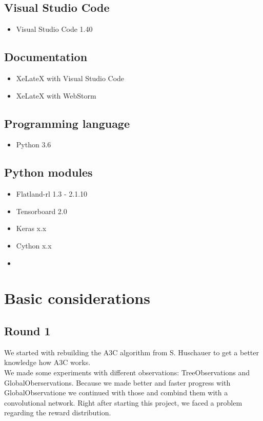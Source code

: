 \subsection*{Visual Studio Code}\label{vsc}
\begin{itemize}
	\item Visual Studio Code 1.40
\end{itemize}

\subsection*{Documentation}\label{dokutools}
\begin{itemize}
	\item XeLateX with Visual Studio Code
	\item XeLateX with WebStorm
\end{itemize}


\subsection*{Programming language}\label{programminglanguages}
\begin{itemize}
	\item Python 3.6
\end{itemize}

\subsection*{Python modules}\label{modules}
\begin{itemize}
	\item Flatland-rl 1.3 - 2.1.10
	\item Tensorboard 2.0
	\item Keras x.x
	\item Cython x.x
	\item %
\end{itemize}


\section{Basic considerations}

\subsection{Round 1}
We started with rebuilding the A3C algorithm from S. Huschauer to get a better knowledge how A3C works.\\
We made some experiments with different observations: TreeObservations and GlobalOberservations.
Because we made better and faster progress with GlobalObservatione we continued with those and combind them with a convolutional network.
Right after starting this project, we faced a problem regarding the reward distribution.\\


